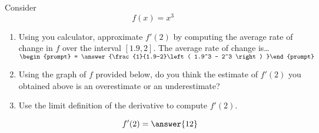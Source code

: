 \documentclass{ximera}
\author{Steven Gubkin}
\begin{document}
\begin{exercise}



Consider 
\[
f(x) = x^3
\]



\begin{enumerate}
\item Using you calculator, approximate $f'(2)$ by computing the average rate of change in $f$ over the interval $[1.9,2]$.  The average rate of change is\dots  $\begin{prompt} = \answer{\frac{1}{1.9-2}\left( 1.9^3 - 2^3 \right) }\end{prompt}$
\item Using the graph of $f$ provided below, do you think the estimate of $f'(2)$ you obtained above is an overestimate or an underestimate?

\begin{prompt}
\begin{multipleChoice}
\end{multipleChoice}
\end{prompt}

\begin{image}
\end{image}

\item Use the limit definition of the derivative to compute $f'(2)$.  \begin{prompt}$$f'(2) = \answer{12}$$\end{prompt}
\end{enumerate}
\end{exercise}
\end{document}
